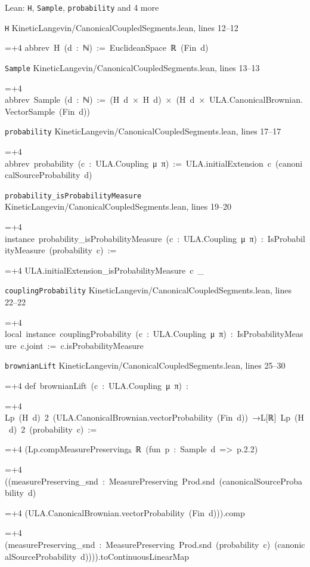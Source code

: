 \documentclass[11pt,a4paper]{article}
\newlength{\leancharwidth}
\newenvironment{leancode}{\par\smallskip\begingroup\ttfamily\footnotesize\raggedright
  \settowidth{\leancharwidth}{M}\setlength{\parskip}{0pt}\setlength{\parindent}{0pt}
  \frenchspacing}{\par\endgroup\smallskip}
\newcommand{\leanline}[2]{\hangindent=\dimexpr#1\leancharwidth+4\leancharwidth\relax
  \hangafter=1\noindent\hspace*{#1\leancharwidth}#2\par}
\newcommand{\leansource}[1]{\par{\footnotesize\color{leanmuted}#1}\par}
\begin{document}
\begin{leanbox}{Lean: \texttt{H}, \texttt{Sample}, \texttt{probability} and 4 more}
\leansource{\texttt{H} \quad KineticLangevin/\allowbreak{}CanonicalCoupledSegments.lean, lines 12–12}
\begin{leancode}
\leanline{0}{abbrev\ H\ (d\ :\ ℕ)\ :=\ EuclideanSpace\ ℝ\ (Fin\ d)}
\end{leancode}
\leansource{\texttt{Sample} \quad KineticLangevin/\allowbreak{}CanonicalCoupledSegments.lean, lines 13–13}
\begin{leancode}
\leanline{0}{abbrev\ Sample\ (d\ :\ ℕ)\ :=\ (H\ d\ ×\ H\ d)\ ×\ (H\ d\ ×\ ULA.CanonicalBrownian.VectorSample\ (Fin\ d))}
\end{leancode}
\leansource{\texttt{probability} \quad KineticLangevin/\allowbreak{}CanonicalCoupledSegments.lean, lines 17–17}
\begin{leancode}
\leanline{0}{abbrev\ probability\ (c\ :\ ULA.Coupling\ μ\ π)\ :=\ ULA.initialExtension\ c\ (canonicalSourceProbability\ d)}
\end{leancode}
\leansource{\texttt{probability\_\allowbreak{}isProbabilityMeasure} \quad KineticLangevin/\allowbreak{}CanonicalCoupledSegments.lean, lines 19–20}
\begin{leancode}
\leanline{0}{instance\ probability\_isProbabilityMeasure\ (c\ :\ ULA.Coupling\ μ\ π)\ :\ IsProbabilityMeasure\ (probability\ c)\ :=}
\leanline{2}{ULA.initialExtension\_isProbabilityMeasure\ c\ \_}
\end{leancode}
\leansource{\texttt{couplingProbability} \quad KineticLangevin/\allowbreak{}CanonicalCoupledSegments.lean, lines 22–22}
\begin{leancode}
\leanline{0}{local\ instance\ couplingProbability\ (c\ :\ ULA.Coupling\ μ\ π)\ :\ IsProbabilityMeasure\ c.joint\ :=\ c.isProbabilityMeasure}
\end{leancode}
\leansource{\texttt{brownianLift} \quad KineticLangevin/\allowbreak{}CanonicalCoupledSegments.lean, lines 25–30}
\begin{leancode}
\leanline{0}{def\ brownianLift\ (c\ :\ ULA.Coupling\ μ\ π)\ :}
\leanline{4}{Lp\ (H\ d)\ 2\ (ULA.CanonicalBrownian.vectorProbability\ (Fin\ d))\ →L[ℝ]\ Lp\ (H\ d)\ 2\ (probability\ c)\ :=}
\leanline{2}{(Lp.compMeasurePreservingₗᵢ\ ℝ\ (fun\ p\ :\ Sample\ d\ =>\ p.2.2)}
\leanline{4}{((measurePreserving\_snd\ :\ MeasurePreserving\ Prod.snd\ (canonicalSourceProbability\ d)}
\leanline{6}{(ULA.CanonicalBrownian.vectorProbability\ (Fin\ d))).comp}
\leanline{6}{(measurePreserving\_snd\ :\ MeasurePreserving\ Prod.snd\ (probability\ c)\ (canonicalSourceProbability\ d)))).toContinuousLinearMap}

\end{leancode}
\end{leanbox}
\end{document}
